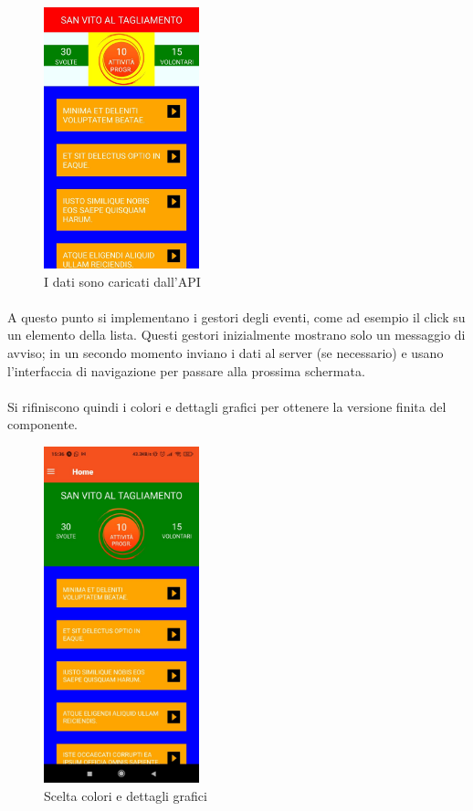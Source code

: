 \documentclass[12pt,a4paper,twoside,english,italian]{book}
\begin{document}
\begin{figure}[H]
    \centering
    \includegraphics[width=0.4\textwidth]{img/app_2.jpeg}
    \caption{I dati sono caricati dall'API}
\end{figure}

\paragraph{} A questo punto si implementano i gestori degli eventi, come ad esempio il click su un elemento della lista. Questi gestori inizialmente mostrano solo un messaggio di avviso; in un secondo momento inviano i dati al server (se necessario) e usano l'interfaccia di navigazione per passare alla prossima schermata.

\paragraph{} Si rifiniscono quindi i colori e dettagli grafici per ottenere la versione finita del componente. 

\begin{figure}[H]
    \centering
    \includegraphics[width=0.4\textwidth]{img/app_3.jpeg}
    \caption{Scelta colori e dettagli grafici}
\end{figure}
\end{document}
